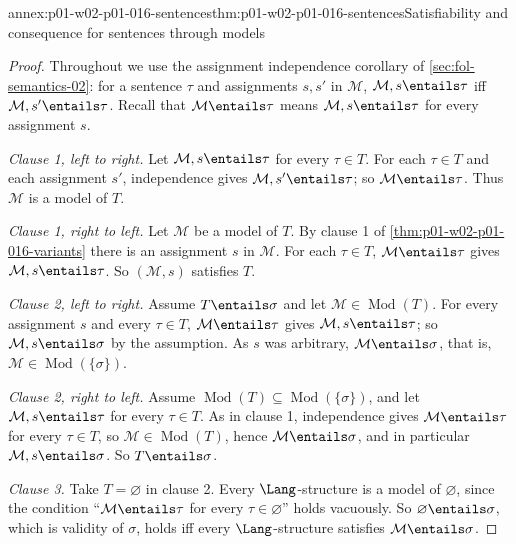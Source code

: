 \begin{annexitem}{annex:p01-w02-p01-016-sentences}{thm:p01-w02-p01-016-sentences}{Satisfiability and consequence for sentences through models}
\begin{proof}
Throughout we use the assignment independence corollary of
\cref{sec:fol-semantics-02}: for a sentence \(\tau\) and assignments
\(s,s'\) in \(\mathcal M\), \(\mathcal M,s\entails\tau\) iff
\(\mathcal M,s'\entails\tau\). Recall that \(\mathcal M\entails\tau\) means
\(\mathcal M,s\entails\tau\) for every assignment \(s\).

\emph{Clause 1, left to right.} Let \(\mathcal M,s\entails\tau\) for every
\(\tau\in T\). For each \(\tau\in T\) and each assignment \(s'\),
independence gives \(\mathcal M,s'\entails\tau\); so
\(\mathcal M\entails\tau\). Thus \(\mathcal M\) is a model of \(T\).

\emph{Clause 1, right to left.} Let \(\mathcal M\) be a model of \(T\). By
clause 1 of \cref{thm:p01-w02-p01-016-variants} there is an assignment \(s\)
in \(\mathcal M\). For each \(\tau\in T\), \(\mathcal M\entails\tau\) gives
\(\mathcal M,s\entails\tau\). So \((\mathcal M,s)\) satisfies \(T\).

\emph{Clause 2, left to right.} Assume \(T\entails\sigma\) and let
\(\mathcal M\in\operatorname{Mod}(T)\). For every assignment \(s\) and every
\(\tau\in T\), \(\mathcal M\entails\tau\) gives \(\mathcal M,s\entails\tau\);
so \(\mathcal M,s\entails\sigma\) by the assumption. As \(s\) was arbitrary,
\(\mathcal M\entails\sigma\), that is,
\(\mathcal M\in\operatorname{Mod}(\{\sigma\})\).

\emph{Clause 2, right to left.} Assume
\(\operatorname{Mod}(T)\subseteq\operatorname{Mod}(\{\sigma\})\), and let
\(\mathcal M,s\entails\tau\) for every \(\tau\in T\). As in clause 1,
independence gives \(\mathcal M\entails\tau\) for every \(\tau\in T\), so
\(\mathcal M\in\operatorname{Mod}(T)\), hence \(\mathcal M\entails\sigma\),
and in particular \(\mathcal M,s\entails\sigma\). So \(T\entails\sigma\).

\emph{Clause 3.} Take \(T=\varnothing\) in clause 2. Every
\(\Lang\)-structure is a model of \(\varnothing\), since the condition
``\(\mathcal M\entails\tau\) for every \(\tau\in\varnothing\)'' holds
vacuously. So \(\varnothing\entails\sigma\), which is validity of \(\sigma\),
holds iff every \(\Lang\)-structure satisfies \(\mathcal M\entails\sigma\).
\end{proof}
\end{annexitem}

